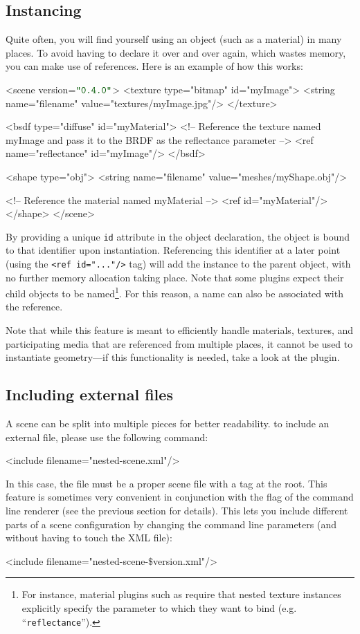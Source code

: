 \subsection{Instancing}
Quite often, you will find yourself using an object (such as a material) in many places. To avoid having
to declare it over and over again, which wastes memory, you can make use of references. Here is an example
of how this works:
\begin{xml}
<scene version=$\MtsVer$>
	<texture type="bitmap" id="myImage">
		<string name="filename" value="textures/myImage.jpg"/>
	</texture>

	<bsdf type="diffuse" id="myMaterial">
		<!-- Reference the texture named myImage and pass it 
			to the BRDF as the reflectance parameter -->
		<ref name="reflectance" id="myImage"/>
	</bsdf>

	<shape type="obj">
		<string name="filename" value="meshes/myShape.obj"/>

		<!-- Reference the material named myMaterial -->
		<ref id="myMaterial"/>
	</shape>
</scene>
\end{xml}
By providing a unique \texttt{id} attribute in the
object declaration, the object is bound to that identifier 
upon instantiation.
Referencing this identifier at a later point (using the \texttt{<ref id="..."/>} tag)
will add the instance to the parent object, with no further memory
allocation taking place. Note that some plugins expect their child objects
to be named\footnote{For instance, material plugins such as  require that
nested texture instances explicitly specify the parameter to which they want to bind (e.g. ``\texttt{reflectance}'').}.
For this reason, a name can also be associated with the reference.

Note that while this feature is meant to efficiently handle materials,
textures, and participating media that are referenced from multiple places,
it cannot be used to instantiate geometry---if this functionality is needed,
take a look at the  plugin.

\subsection{Including external files}
A scene can be split into multiple pieces for better readability. 
to include an external file, please use the following command:
\begin{xml}
<include filename="nested-scene.xml"/>
\end{xml}
In this case, the file  must be a proper scene file with a  tag at the root.
This feature is sometimes very convenient in conjunction with the  flag of the  command line renderer (see the previous section for details).
This lets you include different parts of a scene configuration by changing the command line parameters (and without having to touch the XML file):
\begin{xml}
<include filename="nested-scene-$\texttt{\$}$version.xml"/>
\end{xml}
